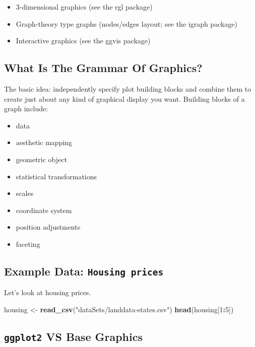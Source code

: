 \documentclass[]{book}
\newenvironment{Shaded}{\begin{snugshade}}{\end{snugshade}}
\newcommand{\KeywordTok}[1]{\textcolor[rgb]{0.13,0.29,0.53}{\textbf{#1}}}
\newcommand{\DecValTok}[1]{\textcolor[rgb]{0.00,0.00,0.81}{#1}}
\newcommand{\StringTok}[1]{\textcolor[rgb]{0.31,0.60,0.02}{#1}}
\newcommand{\OperatorTok}[1]{\textcolor[rgb]{0.81,0.36,0.00}{\textbf{#1}}}
\newcommand{\NormalTok}[1]{#1}
\providecommand{\tightlist}{%
  \setlength{\itemsep}{0pt}\setlength{\parskip}{0pt}}
\begin{document}
\begin{itemize}
\tightlist
\item
  3-dimensional graphics (see the rgl package)
\item
  Graph-theory type graphs (nodes/edges layout; see the igraph package)
\item
  Interactive graphics (see the ggvis package)
\end{itemize}

\subsection{What Is The Grammar Of
Graphics?}\label{what-is-the-grammar-of-graphics}

The basic idea: independently specify plot building blocks and combine
them to create just about any kind of graphical display you want.
Building blocks of a graph include:

\begin{itemize}
\tightlist
\item
  data
\item
  aesthetic mapping
\item
  geometric object
\item
  statistical transformations
\item
  scales
\item
  coordinate system
\item
  position adjustments
\item
  faceting
\end{itemize}

\subsection{\texorpdfstring{Example Data:
\texttt{Housing\ prices}}{Example Data: Housing prices}}\label{example-data-housing-prices}

Let's look at housing prices.

\begin{Shaded}
\begin{Highlighting}[]
\NormalTok{housing <-}\StringTok{ }\KeywordTok{read_csv}\NormalTok{(}\StringTok{"dataSets/landdata-states.csv"}\NormalTok{)}
\KeywordTok{head}\NormalTok{(housing[}\DecValTok{1}\OperatorTok{:}\DecValTok{5}\NormalTok{])}
\end{Highlighting}
\end{Shaded}

\subsection{\texorpdfstring{\texttt{ggplot2} VS Base
Graphics}{ggplot2 VS Base Graphics}}\label{ggplot2-vs-base-graphics}
\end{document}
